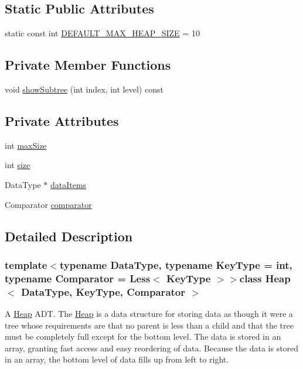 \subsection*{\-Static \-Public \-Attributes}
\begin{DoxyCompactItemize}
\item 
static const int \hyperlink{class_heap_a967c19732a20a72e8e824402ad6763c8}{\-D\-E\-F\-A\-U\-L\-T\-\_\-\-M\-A\-X\-\_\-\-H\-E\-A\-P\-\_\-\-S\-I\-Z\-E} = 10
\end{DoxyCompactItemize}
\subsection*{\-Private \-Member \-Functions}
\begin{DoxyCompactItemize}
\item 
void \hyperlink{class_heap_a49a54dd4782e6c68f14a5df3ba4da7af}{show\-Subtree} (int index, int level) const 
\end{DoxyCompactItemize}
\subsection*{\-Private \-Attributes}
\begin{DoxyCompactItemize}
\item 
int \hyperlink{class_heap_a7f8e5c3cc64b8799b4e75b5a0f675e69}{max\-Size}
\item 
int \hyperlink{class_heap_a0964c2d309605bee2f6f1a9cee9ab89a}{size}
\item 
\-Data\-Type $\ast$ \hyperlink{class_heap_ace779ec73409a031eda4a7c1b898eb56}{data\-Items}
\item 
\-Comparator \hyperlink{class_heap_adc20ebd4d97dff37f19ced91ccdc4560}{comparator}
\end{DoxyCompactItemize}


\subsection{\-Detailed \-Description}
\subsubsection*{template$<$typename \-Data\-Type, typename \-Key\-Type = int, typename \-Comparator = \-Less$<$ Key\-Type $>$$>$class Heap$<$ Data\-Type, Key\-Type, Comparator $>$}

\-A \hyperlink{class_heap}{\-Heap} \-A\-D\-T. \-The \hyperlink{class_heap}{\-Heap} is a data structure for storing data as though it were a tree whose requirements are that no parent is less than a child and that the tree must be completely full except for the bottom level. \-The data is stored in an array, granting fast access and easy reordering of data. \-Because the data is stored in an array, the bottom level of data fills up from left to right. 

